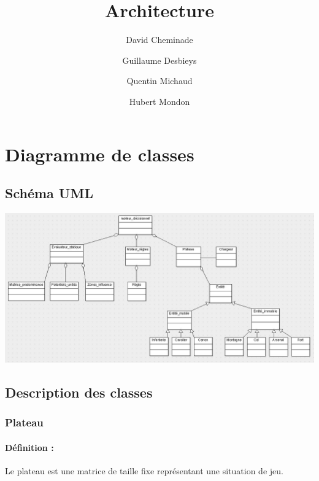 \documentclass[12pt]{article}
\begin{document}
 
	\title{Architecture}             
	\author{
		David Cheminade
		\and
		Guillaume Desbieys
		\and
		Quentin Michaud
		\and
		Hubert Mondon
	}                       
	\date{}
	\maketitle{}                

	\let\thefootnote\relax

	\section{Diagramme de classes}    

		\subsection{Schéma UML}

			\includegraphics[scale=0.4]{images/diag_classes.jpg}

			\clearpage

		\subsection{Description des classes}

			\subsubsection{Plateau}
			
				\paragraph{Définition :}

				Le plateau est une matrice de taille fixe représentant une situation de jeu.
\end{document}
